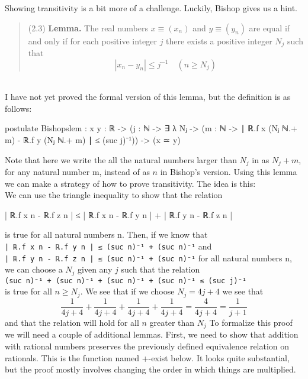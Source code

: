 \documentclass[11pt,a4paper]{article}
\begin{document}
Showing transitivity is a bit more of a challenge. Luckily, Bishop gives us a hint.
\blockquote{
(2.3) \textbf{Lemma.} The real numbers $x\equiv(x_n)$ and $y\equiv(y_n)$ are equal if and only if for each positive integer $j$ there exists a positive integer $N_j$ such that
$$|x_n - y_n| \leq j^{-1} \quad (n \geq N_j)$$
}
\cite{bishop1985constructive}\\
I have not yet proved the formal version of this lemma, but the definition is as follows:
\begin{code}
postulate Bishopslem : {x y : ℝ} -> 
           ({j : ℕ} -> ∃ λ Nⱼ -> ({m : ℕ} -> 
           ∣ ℝ.f x (Nⱼ ℕ.+ m) - ℝ.f y (Nⱼ ℕ.+ m) ∣ ≤ (suc j)⁻¹)) 
           -> (x ≃ y)
\end{code}
Note that here we write the all the natural numbers larger than $N_j$ in as $N_j + m$, for any natural number m, instead of as $n$ in Bishop's version.
Using this lemma we can make a strategy of how to prove transitivity. The idea is this:\\
We can use the triangle inequality to show that the relation
\begin{code}
| ℝ.f x n - ℝ.f z n | ≤ 
| ℝ.f x n - ℝ.f y n | + | ℝ.f y n - ℝ.f z n |
\end{code} 
is true for all natural numbers n. Then, if we know that \\
\texttt{| ℝ.f x n - ℝ.f y n | ≤ (suc n)⁻¹ + (suc n)⁻¹} and \\
\texttt{| ℝ.f y n - ℝ.f z n | ≤ (suc n)⁻¹ + (suc n)⁻¹} for all natural numbers n, we can choose a $N_j$ given any $j$ such that the relation\\
\texttt{(suc n)⁻¹ + (suc n)⁻¹ + (suc n)⁻¹ + (suc n)⁻¹ ≤ (suc j)⁻¹}\\
is true for all $n \geq N_j$. We see that if we choose $N_j = 4j + 4$ we see that
$$\frac{1}{4j + 4}+\frac{1}{4j + 4}+\frac{1}{4j + 4}+\frac{1}{4j + 4}=\frac{4}{4j+4}=\frac{1}{j + 1}$$ and that the relation will hold for all $n$ greater than $N_j$
To formalize this proof we will need a couple of additional lemmas. First, we need to show that addition with rational numbers preserves the previously defined equivalence relation on rationals. This is the function named +-exist below. It looks quite substantial, but the proof mostly involves changing the order in which things are multiplied.
\end{document}
